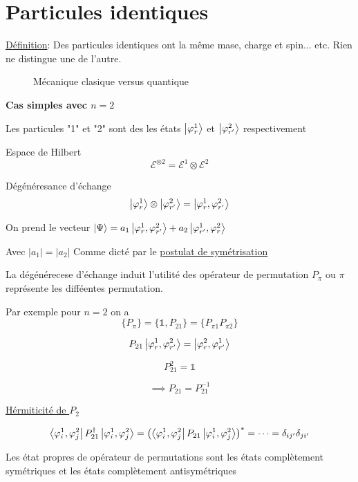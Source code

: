 



\section*{Particules identiques}

\underline{Définition}: Des particules identiques ont la même mase, charge et spin... etc. Rien ne distingue une de l'autre.


\begin{figure}[ht]
    \centering
    \caption{Mécanique clasique versus quantique}
    \label{fig:mécanique-clasique-versus-quantique}
\end{figure}

{\bf Cas simples avec $n=2$ }

Les particules "1" et "2" sont des les états $\ket{\varphi^1_r}$ et $\ket{\varphi_{r'}^2}$ respectivement 

Espace de Hilbert $$ \mathcal{E}^{\otimes 2} = \mathcal{E}^1 \otimes \mathcal{E}^2$$ 

Dégénéresance d'échange $$\ket{\varphi^1_r} \otimes \ket{\varphi_{r'}^2} = \ket{\varphi^1_r, \varphi_{r'}^2}$$ 

On prend le vecteur $\ket{\Psi} = a_{1} \ket{\varphi_{r}^1,\varphi_{r'}^2} + a_{2} \ket{\varphi_{r'}^1, \varphi_{r}^2}$ 

Avec $|a_{1} | = |a_{2} |$ Comme dicté par le \underline{postulat de symétrisation}  

La dégénérecese d'échange induit l'utilité des opérateur de permutation $P_{\pi}$ ou $\pi$ représente les difféentes permutation.

Par exemple pour $n=2$ on a $$\{P_{\pi} \} = \{\mathds{1}, P_{21}\} = \{P_{\pi1} P_{\pi2} \}$$ 

$$P_{21} \ket{\varphi^1_r, \varphi_{r'}^2} = \ket{\varphi^2_r, \varphi_{r'}^1}$$ 

$$P_{21}^2 = \mathds{1}$$ 

$$\implies P_{21} = P_{21}^{-1}$$ 

\underline{Hérmiticité de $P_2$ } 


$$\bra{\varphi_{i}^1, \varphi_{j}^2} P_{21}^\dagger \ket{\varphi_{i}^1, \varphi_{j}^2} = \qty(\bra{\varphi_{i}^1, \varphi_{j}^2} P_{21} \ket{\varphi_{i}^1, \varphi_{j}^2})^* = \dotsb = \delta_{ij'} \delta_{ji'} $$ 


Les état propres de opérateur de permutations sont les états complètement symétriques et les états complètement antisymétriques

